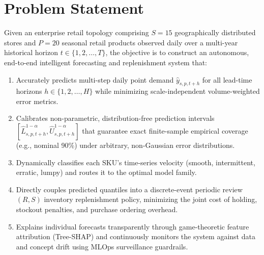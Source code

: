 \documentclass[12pt,a4paper,oneside]{report}
\theoremstyle{definition}
\begin{document}
\section{Problem Statement}
Given an enterprise retail topology comprising $S = 15$ geographically distributed stores and $P = 20$ seasonal retail products observed daily over a multi-year historical horizon $t \in \{1, 2, \dots, T\}$, the objective is to construct an autonomous, end-to-end intelligent forecasting and replenishment system that:
\begin{enumerate}[itemsep=0.2cm]
    \item Accurately predicts multi-step daily point demand $\hat{y}_{s, p, t+h}$ for all lead-time horizons $h \in \{1, 2, \dots, H\}$ while minimizing scale-independent volume-weighted error metrics.
    \item Calibrates non-parametric, distribution-free prediction intervals $[\hat{L}_{s, p, t+h}^{1-\alpha}, \hat{U}_{s, p, t+h}^{1-\alpha}]$ that guarantee exact finite-sample empirical coverage (e.g., nominal 90\%) under arbitrary, non-Gaussian error distributions.
    \item Dynamically classifies each SKU's time-series velocity (smooth, intermittent, erratic, lumpy) and routes it to the optimal model family.
    \item Directly couples predicted quantiles into a discrete-event periodic review $(R, S)$ inventory replenishment policy, minimizing the joint cost of holding, stockout penalties, and purchase ordering overhead.
    \item Explains individual forecasts transparently through game-theoretic feature attribution (Tree-SHAP) and continuously monitors the system against data and concept drift using MLOps surveillance guardrails.
\end{enumerate}
\end{document}
